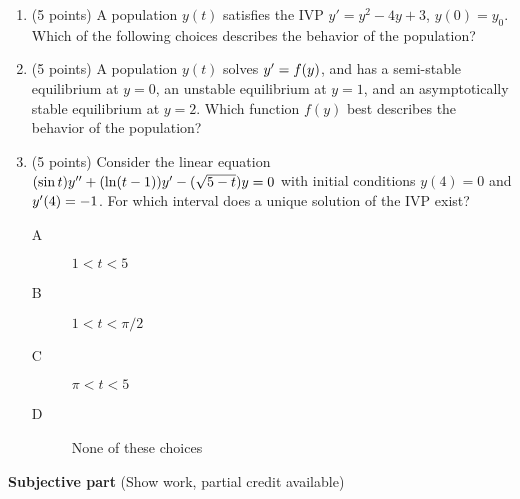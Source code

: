\documentclass{article}
\begin{document}
\begin{enumerate}

\item (5 points) A population $y(t)$ satisfies the IVP $y'=y^2-4y+3$, $y(0)=y_0$.  Which of the following choices describes the behavior of the population?

\item (5 points) A population $y(t)$ solves $y\sp\prime=f(y)$, and has a semi-stable equilibrium at $y=0$, an unstable equilibrium at $y=1$, and an asymptotically stable equilibrium at $y=2$.  Which function $f(y)$ best describes the behavior of the population?

\newpage
\item (5 points) Consider the linear equation $(\sin t)y\sp{\prime\prime}+(\ln(t-1))y\sp\prime-(\sqrt{5-t})y=0$ with initial conditions $y(4)=0$ and $y\sp\prime(4)=-1$.  For which interval does a unique solution of the IVP exist?
\begin{description}
\item[A] $1<t<5$
\item[B] $1<t<\pi/2$		
\item[C] $\pi<t<5$
\item[D] None of these choices
\end{description}

\end{enumerate}

\bigskip\noindent
{\bf Subjective part} (Show work, partial credit available)
\end{document}
